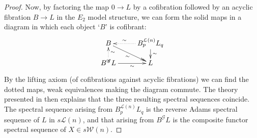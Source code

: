\documentclass[11pt]{amsart} \renewcommand{\baselinestretch}{1.4}
\theoremstyle{plain}
\theoremstyle{definition}
\renewcommand{\to}{\longrightarrow}
\newcommand{\scrG}{\mathscr{G}}
\newcommand{\calL}{\mathcal{L}}
\newcommand{\calw}{\mathcal{W}}
\newcommand{\BSW}{{\scrG}}
\begin{document}
\begin{Composite functor spectral sequences}
\begin{proof}
Now, by factoring the map $0\to L$ by a cofibration followed by an acyclic fibration $B\to L$ in the $E_2$ model structure, we can form the solid maps in a diagram in which each object `$B$' is cofibrant:
\[\xymatrix@R=4mm{
B\ar@{->>}[dr]_-{\sim}
&%
B^{\calL(n)}_pL_q\ar[d]^-{\sim}\ar@{..>}[l]_-{\sim}\\%
B^{\BSW}L\ar[r]_-{\sim}\ar@{..>}[u]_-{\sim}&%
L%
}\]
By the lifting axiom (of cofibrations against acyclic fibrations) we can find the dotted maps, weak equivalences making the diagram commute. The theory presented in \cite{DKS.pdf} then explains that the three resulting spectral sequences  coincide. The spectral sequence arising from $B^{\calL(n)}_pL_q$ is the reverse Adams spectral sequence of $L$ in $s\calL(n)$, and that arising from $B^{\BSW}L$ is the composite functor spectral sequence of $X\in s\calw(n)$.
\end{proof}
\end{Composite functor spectral sequences}
\end{document}
